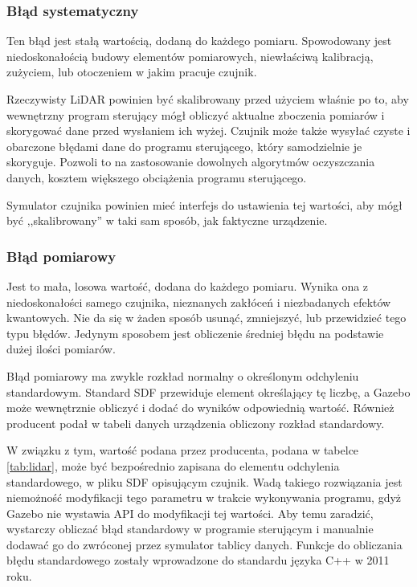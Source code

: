 		\subsubsection{Błąd systematyczny}
			Ten błąd jest stałą wartością, dodaną do każdego pomiaru.
			Spowodowany jest niedoskonałością budowy elementów pomiarowych, niewłaściwą kalibracją, zużyciem, lub otoczeniem w jakim pracuje czujnik.

			Rzeczywisty LiDAR powinien być skalibrowany przed użyciem właśnie po to, aby wewnętrzny program sterujący mógł obliczyć aktualne zboczenia pomiarów
			i skorygować dane przed wysłaniem ich wyżej.
			Czujnik może także wysyłać czyste i obarczone błędami dane do programu sterującego, który samodzielnie je skoryguje.
			Pozwoli to na zastosowanie dowolnych algorytmów oczyszczania danych, kosztem większego obciążenia programu sterującego.

			Symulator czujnika powinien mieć interfejs do ustawienia tej wartości, aby mógł być ,,skalibrowany'' w taki sam sposób, jak faktyczne urządzenie.

		\subsubsection{Błąd pomiarowy}
			Jest to mała, losowa wartość, dodana do każdego pomiaru.
			Wynika ona z niedoskonałości samego czujnika, nieznanych zakłóceń i niezbadanych efektów kwantowych.
			Nie da się w żaden sposób usunąć, zmniejszyć, lub przewidzieć tego typu błędów.
			Jedynym sposobem jest obliczenie średniej błędu na podstawie dużej ilości pomiarów.

			Błąd pomiarowy ma zwykle rozkład normalny o określonym odchyleniu standardowym.
			Standard SDF przewiduje element określający tę liczbę, a Gazebo może wewnętrznie obliczyć i dodać do wyników odpowiednią wartość.
			Również producent podał w tabeli danych urządzenia obliczony rozkład standardowy.

			W związku z tym, wartość podana przez producenta, podana w tabelce \ref{tab:lidar}, może być bezpośrednio zapisana do 
			elementu odchylenia standardowego, w pliku SDF opisującym czujnik.
			Wadą takiego rozwiązania jest niemożność modyfikacji tego parametru w trakcie wykonywania programu, gdyż Gazebo nie wystawia API do modyfikacji tej wartości.
			Aby temu zaradzić, wystarczy obliczać błąd standardowy w programie sterującym i manualnie dodawać go do zwróconej przez symulator tablicy danych.
			Funkcje do obliczania błędu standardowego zostały wprowadzone do standardu języka C++ w 2011 roku.
			

